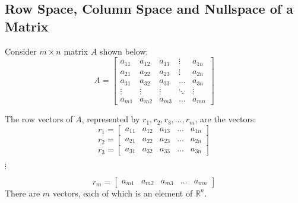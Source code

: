 \documentclass[12pt]{article}
\begin{document}
\subsection{Row Space, Column Space and Nullspace of a Matrix} 
Consider $m \times n$ matrix $A$ shown below: $$ A = \begin{bmatrix} a_{11} & a_{12} & a_{13} & \vdots & a_{1n} \\ a_{21} & a_{22} & a_{23} & \vdots & a_{2n} \\ a_{31} & a_{32} & a_{33} & \hdots & a_{3n}  \\ \vdots & \vdots & \vdots & \ddots & \vdots \\ a_{m1} & a_{m2} & a_{m3} & \hdots & a_{mn} \end{bmatrix} $$ 
\begin{definition} The row vectors of $A$, represented by $r_1, r_2, r_3, \dots, r_m $, are the vectors: $$ r_1 = \begin{bmatrix} a_{11} & a_{12} & a_{13} & \dots & a_{1n} \end{bmatrix} $$ $$ r_2 = \begin{bmatrix} a_{21} & a_{22} & a_{23} & \dots &a_{2n} \end{bmatrix} $$ $$ r_3 = \begin{bmatrix} a_{31} & a_{32} & a_{33} & \dots & a_{3n} \end{bmatrix} $$ \begin{center} $\vdots$ \end{center} $$ r_m = \begin{bmatrix} a_{m1} & a_{m2} & a_{m3} & \dots & a_{mn} \end{bmatrix} $$ There are $m$ vectors, each of which is an element of $\mathbb{R}^n$. \end{definition} 
\end{document}
